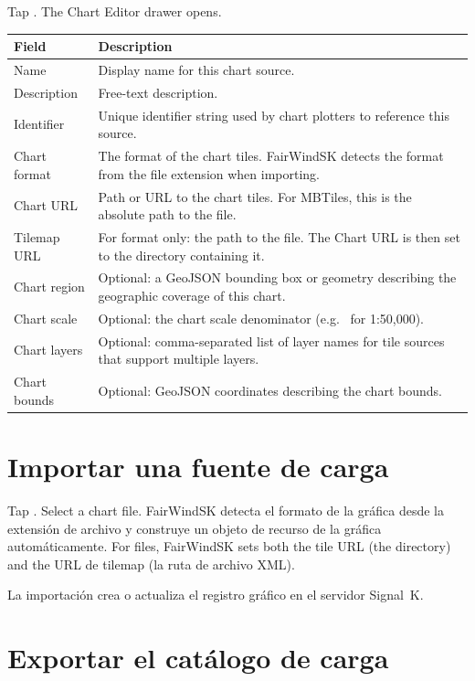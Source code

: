Tap . The Chart Editor drawer opens.

\begin{longtable}{L{3cm} L{10.7cm}}
\toprule
{}
{\sffamily\bfseries\color{white} Field} &
{\sffamily\bfseries\color{white} Description} \\
\midrule
Name & Display name for this chart source. \\
Description & Free-text description. \\
Identifier & Unique identifier string used by chart plotters to reference this source. \\
Chart format & The format of the chart tiles. FairWindSK detects the format from the file extension when importing. \\
Chart URL & Path or URL to the chart tiles. For MBTiles, this is the absolute path to the  file. \\
Tilemap URL & For  format only: the path to the  file. The Chart URL is then set to the directory containing it. \\
Chart region & Optional: a GeoJSON bounding box or geometry describing the geographic coverage of this chart. \\
Chart scale & Optional: the chart scale denominator (e.g.\  for 1:50,000). \\
Chart layers & Optional: comma-separated list of layer names for tile sources that support multiple layers. \\
Chart bounds & Optional: GeoJSON coordinates describing the chart bounds. \\
\bottomrule
\end{longtable}

\section{Importar una fuente de carga}

Tap . Select a chart file.
FairWindSK detecta el formato de la gráfica desde la extensión de archivo y construye un objeto de recurso de la gráfica
automáticamente.
For  files, FairWindSK sets both the tile URL (the directory) and the
URL de tilemap (la ruta de archivo XML).

La importación crea o actualiza el registro gráfico en el servidor Signal~K.

\section{Exportar el catálogo de carga}

